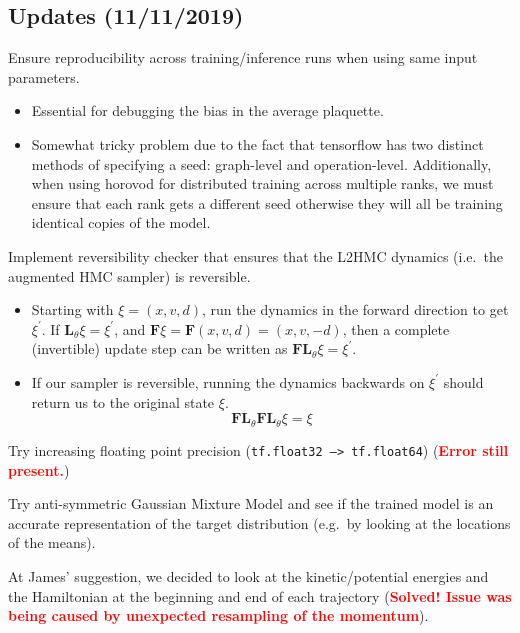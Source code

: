 \subsection{Updates (11/11/2019)}
\begin{todolist}
  \item[\done] Ensure reproducibility across training/inference runs when
    using same input parameters.
    \begin{itemize}
      \item Essential for debugging the bias in the average plaquette.
      \item Somewhat tricky problem due to the fact that tensorflow 
        has two distinct methods of specifying a seed: graph-level and
        operation-level. Additionally, when using horovod for distributed
        training across multiple ranks, we must ensure that each rank gets a
        different seed otherwise they will all be training identical copies of
        the model.
    \end{itemize}

  \item[\done] Implement reversibility checker that ensures that the L2HMC
    dynamics (i.e.\ the augmented HMC sampler) is reversible.
    \begin{itemize}
      \item Starting with $\xi = (x, v, d)$, run the dynamics in the forward
        direction to get $\xi^{\prime}$. If $\mathbf{L}_{\theta}
        \xi =  \xi^{\prime}$, and $\mathbf{F} \xi = \mathbf{F} (x, v, d) = (x,
        v, -d)$, then a complete (invertible) update step can be written as
        $\mathbf{FL}_{\theta}\xi = \xi^{\prime}$.
      \item If our sampler is reversible, running the dynamics backwards on
        $\xi^{\prime}$ should return us to the original state $\xi$. 
        \begin{equation}
          \mathbf{FL}_{\theta}\mathbf{FL}_{\theta} \xi = \xi
        \end{equation}
    \end{itemize}

  \item[\done] Try increasing floating point precision (\texttt{tf.float32 -->
    tf.float64}) (\textbf{\textcolor{red}{Error still present.}}) 

  \item[\done] Try anti-symmetric Gaussian Mixture Model and see if the trained
    model is an accurate representation of the target distribution (e.g.\ by
    looking at the locations of the means).

  \item[\done] At James' suggestion, we decided to look at the
    kinetic/potential energies and the Hamiltonian at the beginning and end of
    each trajectory (\textbf{\textcolor{red}{Solved! Issue was being caused by
    unexpected resampling of the momentum}}).
  \end{todolist}
